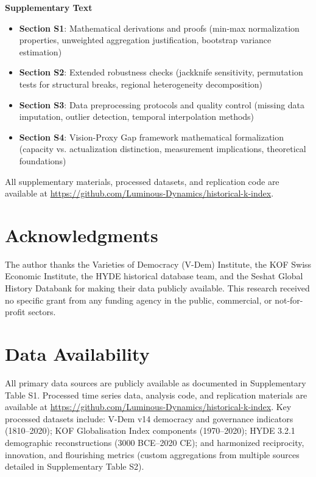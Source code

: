 \documentclass[11pt,letterpaper]{article}
\begin{document}
\textbf{Supplementary Text}
\begin{itemize}
\item \textbf{Section S1}: Mathematical derivations and proofs (min-max normalization properties, unweighted aggregation justification, bootstrap variance estimation)
\item \textbf{Section S2}: Extended robustness checks (jackknife sensitivity, permutation tests for structural breaks, regional heterogeneity decomposition)
\item \textbf{Section S3}: Data preprocessing protocols and quality control (missing data imputation, outlier detection, temporal interpolation methods)
\item \textbf{Section S4}: Vision-Proxy Gap framework mathematical formalization (capacity vs. actualization distinction, measurement implications, theoretical foundations)
\end{itemize}

All supplementary materials, processed datasets, and replication code are available at \url{https://github.com/Luminous-Dynamics/historical-k-index}.

\section*{Acknowledgments}

The author thanks the Varieties of Democracy (V-Dem) Institute, the KOF Swiss Economic Institute, the HYDE historical database team, and the Seshat Global History Databank for making their data publicly available. This research received no specific grant from any funding agency in the public, commercial, or not-for-profit sectors.

\section*{Data Availability}

All primary data sources are publicly available as documented in Supplementary Table S1. Processed time series data, analysis code, and replication materials are available at \url{https://github.com/Luminous-Dynamics/historical-k-index}. Key processed datasets include: V-Dem v14 democracy and governance indicators (1810--2020); KOF Globalisation Index components (1970--2020); HYDE 3.2.1 demographic reconstructions (3000 BCE--2020 CE); and harmonized reciprocity, innovation, and flourishing metrics (custom aggregations from multiple sources detailed in Supplementary Table S2).
\end{document}
